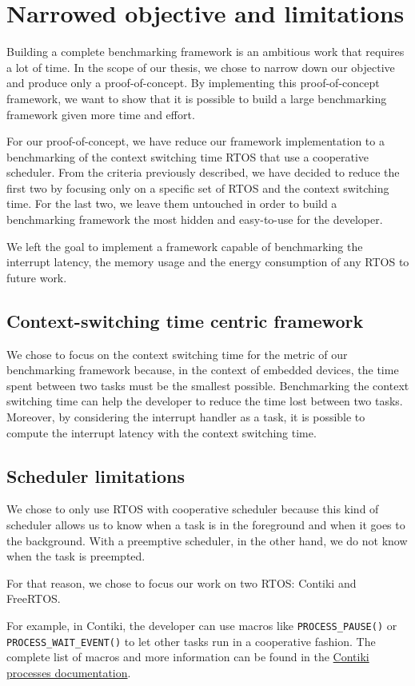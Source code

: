 \section{Narrowed objective and limitations}

Building a complete benchmarking framework is an ambitious work that requires a lot of time.
In the scope of our thesis, we chose to narrow down our objective and produce only a proof-of-concept.
By implementing this proof-of-concept framework, we want to show that it is possible to build a large benchmarking framework given more time and effort.

For our proof-of-concept, we have reduce our framework implementation to a benchmarking of the context switching time RTOS that use a cooperative scheduler.
From the criteria previously described, we have decided to reduce the first two by focusing only on a specific set of RTOS and the context switching time.
For the last two, we leave them untouched in order to build a benchmarking framework the most hidden and easy-to-use for the developer.

We left the goal to implement a framework capable of benchmarking the interrupt latency, the memory usage and the energy consumption of any RTOS to future work.

\subsection{Context-switching time centric framework}

We chose to focus on the context switching time for the metric of our benchmarking framework because, in the context of embedded devices, the time spent between two tasks must be the smallest possible.
Benchmarking the context switching time can help the developer to reduce the time lost between two tasks.
Moreover, by considering the interrupt handler as a task, it is possible to compute the interrupt latency with the context switching time.

\subsection{Scheduler limitations}

We chose to only use RTOS with cooperative scheduler because this kind of scheduler allows us to know when a task is in the foreground and when it goes to the background.
With a preemptive scheduler, in the other hand, we do not know when the task is preempted.

For that reason, we chose to focus our work on two RTOS: Contiki and FreeRTOS.

For example, in Contiki, the developer can use macros like \texttt{PROCESS\_PAUSE()} or \texttt{PROCESS\_WAIT\_EVENT()} to let other tasks run in a cooperative fashion.
The complete list of macros and more information can be found in the \href{https://github.com/contiki-os/contiki/wiki/Processes}{Contiki processes documentation}.